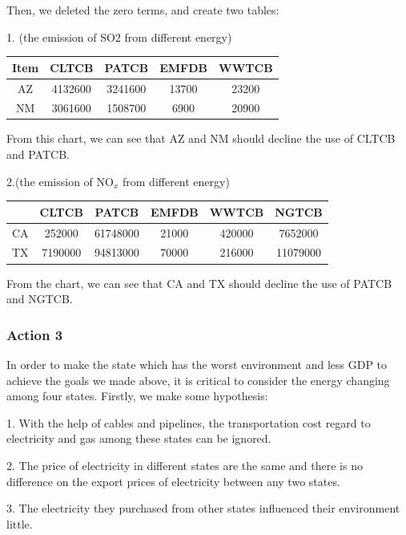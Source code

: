 \documentclass[12pt]{article}
\begin{document}
Then, we deleted the zero terms, and create two tables:

1. (the emission of SO2 from different energy)

\begin{table}[!h]\centering
\begin{tabular}{|c|c|c|c|c| }
\hline
Item&	CLTCB&	PATCB&	EMFDB&	WWTCB\\
\hline
AZ&	4132600&	3241600	&13700&	23200\\
\hline
NM&	3061600	&1508700&	6900&	20900\\

\hline
\end{tabular}
\end{table}
From this chart, we can see that AZ and NM should decline the use of CLTCB and PATCB.


2.(the emission of $\mathrm{NO}_{x}$ from different energy)

\begin{table}[!h]\centering
\begin{tabular}{|c|c|c|c|c| c|}
\hline
	&CLTCB	&PATCB	&EMFDB&	WWTCB&	NGTCB\\
\hline
CA	&252000	&61748000&	21000	&420000	&7652000\\
\hline
TX	&7190000	&94813000	&70000	&216000	&11079000\\
\hline
\end{tabular}
\end{table}

From the chart, we can see that CA and TX should decline the use of PATCB and NGTCB.




\subsubsection{Action 3}

In order to make the state which has the worst environment and less GDP to achieve the goals we made above, it is critical to consider the energy changing among four states. Firstly, we make some hypothesis:

1. With the help of cables and pipelines, the transportation cost regard to electricity and gas among these states can be ignored.

2. The price of electricity in different states are the same and there is no difference on the export prices of electricity between any two states.

3. The electricity they purchased from other states influenced their environment little.
\end{document}

